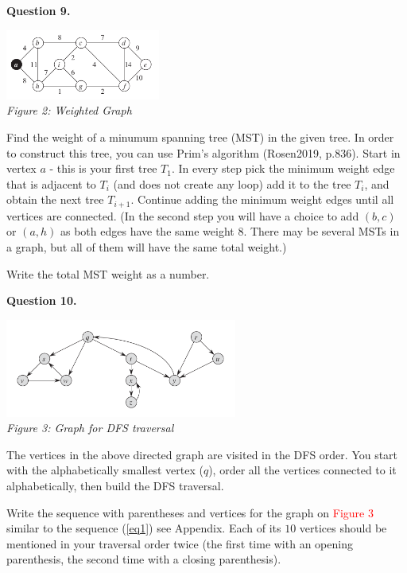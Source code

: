 \documentclass[jou]{apa6}
\begin{document}
\newpage
{\bf Question 9.}
\begin{center}
\includegraphics[width=2in]{prim-algorithm.png}\\
{\em Figure 2: Weighted Graph}
\end{center}
Find the weight of a minumum spanning tree (MST) in the given tree. 
In order to construct this tree, you can use Prim's algorithm (Rosen2019, p.836). 
Start in vertex $a$ - this is your first tree $T_1$. 
In every step pick the minimum weight edge that is adjacent to $T_i$ (and does 
not create any loop) \textendash{} add it to the tree $T_i$, and obtain the next 
tree $T_{i+1}$. Continue adding the minimum weight edges until all vertices are connected.
(In the second step you will have a choice 
to add $(b,c)$ or $(a,h)$ as both edges have the same weight $8$. There may be several MSTs
in a graph, but all of them will have the same total weight.)

Write the total MST weight as a number.



\vspace{4pt}
{\bf Question 10.}
\begin{center}
\includegraphics[width=3in]{dfs-traversal2.png}\\
{\em Figure 3: Graph for DFS traversal}
\end{center}

The vertices in the above directed graph are visited in the DFS
order. You start with the alphabetically smallest vertex ($q$), order all the vertices connected to it
alphabetically, then build the DFS traversal. 

Write the sequence with parentheses and vertices for the graph 
on \textcolor{red}{Figure 3} \textendash{} similar to the sequence (\ref{eq1}) \textendash{} see Appendix. 
Each of its $10$ vertices should be mentioned in your 
traversal order twice (the first time with an opening parenthesis, the second time 
with a closing parenthesis).
\end{document}
